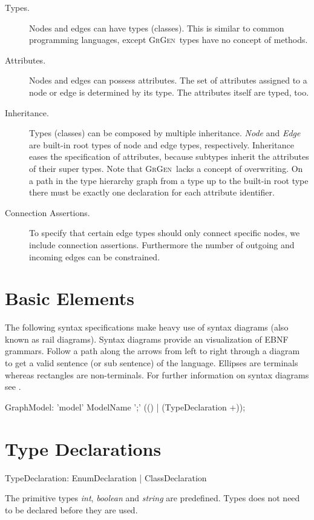 \documentclass[a4paper,11pt]{report}
\providecommand{\GrG}{{\scshape GrGen}}
\begin{document}
\begin{description}
\item[Types.] Nodes and edges can have types (classes). This is similar to common programming languages, except \GrG\ types have no concept of methods. 
\item[Attributes.] Nodes and edges can possess attributes. The set of attributes assigned to a node or edge is determined by its type. The attributes itself are typed, too.
\item[Inheritance.] Types (classes) can be composed by multiple inheritance. \emph{Node} and \emph{Edge} are built-in root types of node and edge types, respectively. Inheritance eases the specification of attributes, because subtypes inherit the attributes of their super types. Note that \GrG\ lacks a concept of overwriting. On a path in the type hierarchy graph from a type up to the built-in root type there must be exactly one declaration for each attribute identifier.
\item[Connection Assertions.] To specify that certain edge types should only connect specific nodes, we include connection assertions. Furthermore the number of outgoing and incoming edges can be constrained.
\end{description}

\section{Basic Elements}

The following syntax specifications make heavy use of syntax diagrams (also known as rail diagrams). Syntax diagrams provide an visualization of EBNF grammars. Follow a path along the arrows from left to right through a diagram to get a valid sentence (or sub sentence) of the language. Ellipses are terminals whereas rectangles are non-terminals. For further information on syntax diagrams see \cite{pascal}.

\begin{rail}
  GraphModel: 'model' ModelName ';' (() | (TypeDeclaration +));
\end{rail}

\section{Type Declarations}
\begin{rail}
  TypeDeclaration: EnumDeclaration | ClassDeclaration
\end{rail}
The primitive types \emph{int}, \emph{boolean} and \emph{string} are predefined. Types does not need to be declared before they are used.
\end{document}
